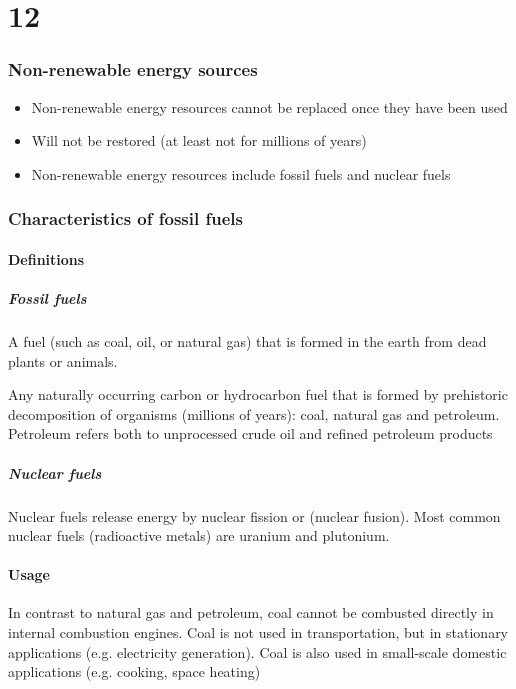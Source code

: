 \documentclass{article}
\begin{document}
\part{12}
\section{Non-renewable energy sources}
\begin{itemize}
    \item Non-renewable energy resources cannot be replaced once they have been used
    \item Will not be restored (at least not for millions of years)
    \item Non-renewable energy resources include fossil fuels and nuclear fuels
\end{itemize}

\section{Characteristics of fossil fuels}
\subsection{Definitions}
\subsubsection{Fossil fuels}
A fuel (such as coal, oil, or natural gas) that is formed in the earth from dead plants or animals.

Any naturally occurring carbon or hydrocarbon fuel that is formed by prehistoric decomposition of
organisms (millions of years): coal, natural gas and petroleum.
Petroleum refers both to unprocessed crude oil and refined petroleum products

\subsubsection{Nuclear fuels}
Nuclear fuels release energy by nuclear fission or (nuclear fusion).
Most common nuclear fuels (radioactive metals) are uranium and plutonium.

\subsection{Usage}
In contrast to natural gas and petroleum, coal cannot be combusted directly in internal
combustion engines.
Coal is not used in transportation, but in stationary applications (e.g. electricity generation).
Coal is also used in small-scale domestic applications (e.g. cooking, space heating)
\end{document}
